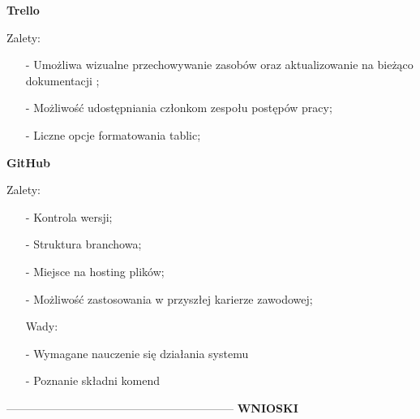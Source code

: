 \documentclass[a4paper,titleauthor]{mwart}
\begin{document}
	\textbf{Trello} \newline
	\indent
	
	Zalety:
	\begin{itemize}
		
		\item[-]
		Umożliwa wizualne przechowywanie zasobów oraz aktualizowanie na bieżąco dokumentacji ;
		
		\item[-]
		Możliwość udostępniania członkom zespołu postępów pracy;
		
		\item[-]
		Liczne opcje formatowania tablic;
		
		
	\end{itemize}
	\vspace{1cm}
	
	\textbf{GitHub} \newline
	\indent
	
	Zalety:
	\begin{itemize}
		\item[-]
		Kontrola wersji;
		
		\item[-]
		Struktura branchowa;
		
		\item[-]
		Miejsce na hosting plików;
		
		\item[-]
		Możliwość zastosowania w przyszłej karierze zawodowej;
		
		
		Wady:
		\item[-]
		Wymagane nauczenie się działania systemu
		
		\item[-]
		Poznanie składni komend
	\end{itemize}
	
	------------------------------------------------------------\newline \newline \newline \newline
	\vspace{0,5cm}
	\textbf{WNIOSKI} \newline
	
\end{document}
